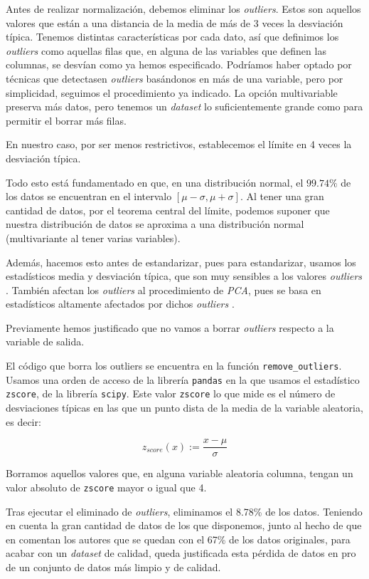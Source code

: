 \documentclass[11pt]{article}
\begin{document}
Antes de realizar normalización, debemos eliminar los \emph{outliers}. Estos son aquellos valores que están a una distancia de la media de más de 3 veces la desviación típica. Tenemos distintas características por cada dato, así que definimos los \emph{outliers} como aquellas filas que, en alguna de las variables que definen las columnas, se desvían como ya hemos especificado. Podríamos haber optado por técnicas que detectasen \emph{outliers} basándonos en más de una variable, pero por simplicidad, seguimos el procedimiento ya indicado. La opción multivariable preserva más datos, pero tenemos un \emph{dataset} lo suficientemente grande como para permitir el borrar más filas.

En nuestro caso, por ser menos restrictivos, establecemos el límite en 4 veces la desviación típica.

Todo esto está fundamentado en que, en una distribución normal, el $99.74\%$ de los datos se encuentran en el intervalo $[\mu - \sigma, \mu + \sigma]$. Al tener una gran cantidad de datos, por el teorema central del límite, podemos suponer que nuestra distribución de datos se aproxima a una distribución normal (multivariante al tener varias variables).

Además, hacemos esto antes de estandarizar, pues para estandarizar, usamos los estadísticos media y desviación típica, que son muy sensibles a los valores \emph{outliers} \cite{scikit_scale_with_outliers:online}. También afectan los \emph{outliers} al procedimiento de \emph{PCA}, pues se basa en estadísticos altamente afectados por dichos \emph{outliers} \cite{pca_medium:online}.

Previamente hemos justificado que no vamos a borrar \emph{outliers} respecto a la variable de salida.

El código que borra los outliers se encuentra en la función \lstinline{remove_outliers}. Usamos una orden de acceso de la librería \lstinline{pandas} en la que usamos el estadístico \lstinline{zscore}, de la librería \lstinline{scipy}. Este valor \lstinline{zscore} lo que mide es el número de desviaciones típicas en las que un punto dista de la media de la variable aleatoria, es decir:

$$z_{score}(x) := \frac{x - \mu}{\sigma}$$

Borramos aquellos valores que, en alguna variable aleatoria columna, tengan un valor absoluto de \lstinline{zscore} mayor o igual que 4.

Tras ejecutar el eliminado de \emph{outliers}, eliminamos el 8.78\% de los datos. Teniendo en cuenta la gran cantidad de datos de los que disponemos, junto al hecho de que en \cite{original_paper_reg:paper} comentan los autores que se quedan con el 67\% de los datos originales, para acabar con un \emph{dataset} de calidad, queda justificada esta pérdida de datos en pro de un conjunto de datos más limpio y de calidad.
\end{document}
